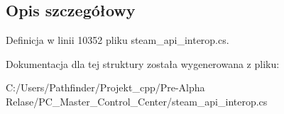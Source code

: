 \subsection{Opis szczegółowy}


Definicja w linii 10352 pliku steam\+\_\+api\+\_\+interop.\+cs.



Dokumentacja dla tej struktury została wygenerowana z pliku\+:\begin{DoxyCompactItemize}
\item 
C\+:/\+Users/\+Pathfinder/\+Projekt\+\_\+cpp/\+Pre-\/\+Alpha Relase/\+P\+C\+\_\+\+Master\+\_\+\+Control\+\_\+\+Center/steam\+\_\+api\+\_\+interop.\+cs\end{DoxyCompactItemize}
